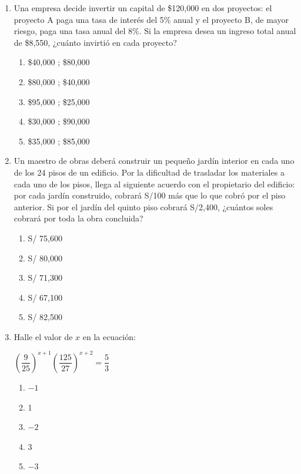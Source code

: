 
\begin{enumerate}

	\item Una empresa decide invertir un capital de \$120,000 en dos proyectos: el proyecto A paga una tasa de interés del 5\% anual y el proyecto B, de mayor riesgo, paga una tasa anual del 8\%. Si la empresa desea un ingreso total anual de \$8,550, ¿cuánto invirtió en cada proyecto?
	\begin{enumerate}[label=\alph*)]
		\item \$40,000 ; \$80,000
		\item \$80,000 ; \$40,000
		\item \$95,000 ; \$25,000
		\item \$30,000 ; \$90,000
		\item \$35,000 ; \$85,000
	\end{enumerate}

	\item Un maestro de obras deberá construir un pequeño jardín interior en cada uno de los 24 pisos de un edificio. Por la dificultad de trasladar los materiales a cada uno de los pisos, llega al siguiente acuerdo con el propietario del edificio: por cada jardín construido, cobrará S/100 más que lo que cobró por el piso anterior. Si por el jardín del quinto piso cobrará S/2,400, ¿cuántos soles cobrará por toda la obra concluida?
	\begin{enumerate}[label=\alph*)]
		\item S/ 75,600
		\item S/ 80,000
		\item S/ 71,300
		\item S/ 67,100
		\item S/ 82,500
	\end{enumerate}

	\item Halle el valor de $x$ en la ecuación:

	$\left(\dfrac{9}{25}\right)^{x+1}\left(\dfrac{125}{27}\right)^{x+2}=\dfrac{5}{3}$

	\begin{enumerate}[label=\alph*)]
		\item $-1$
		\item 1
		\item $-2$
		\item 3
		\item $-3$
	\end{enumerate}


\end{enumerate}
